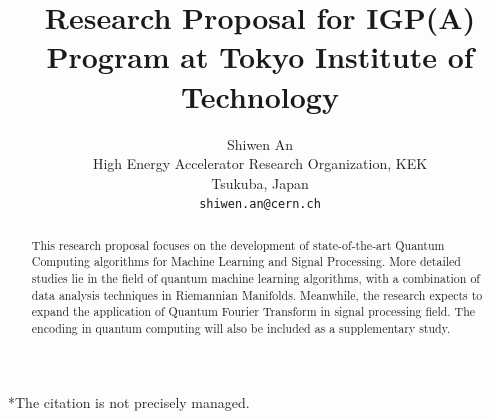 \documentclass{article}
\title{Research Proposal for IGP(A) Program at Tokyo 
Institute of Technology}
\author{
 Shiwen An \\
 High Energy Accelerator Research Organization, KEK \\
  Tsukuba, Japan \\
  \texttt{shiwen.an@cern.ch} \\
}
\begin{document}
\maketitle
\begin{abstract}
This research proposal focuses on the development of 
state-of-the-art Quantum Computing algorithms for Machine 
Learning and Signal Processing. More detailed 
studies lie in the field of quantum machine learning algorithms, 
with a combination of data analysis techniques in Riemannian Manifolds. 
Meanwhile, the research expects to expand the application of Quantum
 Fourier Transform in signal processing field. 
 The encoding in quantum computing will also be included 
 as a supplementary study.
\end{abstract}


*The citation is not precisely managed. 
\end{document}
